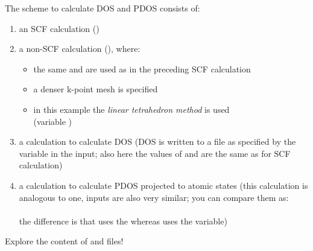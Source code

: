 \documentclass[landscape]{foils}
\begin{document}
The scheme to calculate DOS and PDOS consists of:\vspace{-0.8em}
\begin{enumerate}
\item an SCF  calculation ()\vspace{-0.8em}
\item a non-SCF  calculation (),
  where:\vspace{-0.3em}
  \begin{itemize}
  \item the same  and  are used as in the preceding SCF calculation
  \item a denser k-point mesh is specified
  \item in this example the {\em linear tetrahedron method} is used\\
    (variable )
  \end{itemize}\vspace{-0.8em}
\item a  calculation to calculate DOS {\small\gray (DOS is
    written to a file as specified by the  variable in the
     input; also here the values of  and
     are the same as for SCF 
    calculation)}\vspace{-0.8em}
\item a  calculation to calculate PDOS projected to
  atomic states {\small\gray (this calculation is analogous to
     one,
    inputs are also very similar; you can compare them as:}\\[0.5em]
  \\[0.5em]
  {\small\gray the difference is that  uses the 
    whereas  uses the  variable)}
\end{enumerate}
Explore the content of  and  files!  
\end{document}
